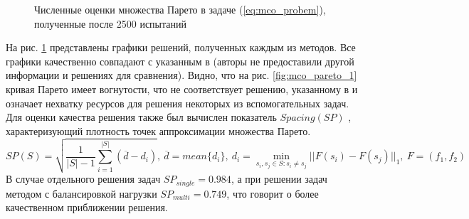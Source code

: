 \documentclass{cmi}
\begin{document}
\begin{figure}[ht]
    \centering
    \caption{Численные оценки множества Парето в задаче (\ref{eq:mco_probem}), полученные после 2500 испытаний}
    \label{fig:mco_pareto}
\end{figure}

На рис. \ref{fig:mco_pareto} представлены графики решений, полученных каждым из методов.
Все графики качественно совпадают с указанным в \cite{BinhKorn1999} (авторы не предоставили другой
информации и решениях для сравнения). Видно, что на рис. \ref{fig:mco_pareto_1}
кривая Парето имеет вогнутости, что не соответствует решению, указанному в \cite{BinhKorn1999} и
означает нехватку ресурсов для решения некоторых из вспомогательных задач.
Для оценки качества решения также был вычислен показатель \(Spacing(SP)\) \cite{RiquelmeLucken2015},
характеризующий плотность точек аппроксимации множества Парето.
\begin{displaymath}
  SP(S)=\sqrt{\frac{1}{|S|-1} \sum_{i=1}^{|S|} (\overline{d}-d_i)},
  \:\overline{d}=mean\{d_i\},\:d_i=\min_{s_i,s_j\in S:s_i\ne s_j}||F(s_i)-F(s_j)||_1,\: F=(f_1,f_2)
\end{displaymath}
В случае отдельного решения задач \(SP_{single}=0.984\), а при решении задач методом с балансировкой нагрузки
\(SP_{multi}=0.749\), что говорит о более качественном приближении решения.
\end{document}
